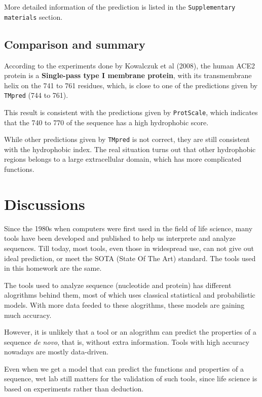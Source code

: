 \documentclass[en,black,10pt,normal]{elegantnote}
\newcommand{\upcite}[1]{\textsuperscript{\textsuperscript{\cite{#1}}}}
\begin{document}
More detailed information of the prediction is listed in the \texttt{Supplementary materials} section.


\subsection{Comparison and summary}

According to the experiments done by Kowalczuk et al (2008), the human ACE2 protein is a 
\textbf{Single-pass type I membrane protein}, with its 
transmembrane helix on the 741 to 761 residues,\upcite{kowalczuk2008protein} which,
is close to one of the predictions given by \texttt{TMpred} (744 to 761).

This result is consistent with the predictions given by \texttt{ProtScale}, 
which indicates that the 740 to 770 of the sequence has a high hydrophobic score.

While other predictions given by \texttt{TMpred} is not correct, 
they are still consistent with the hydrophobic index. 
The real situation turns out that other hydrophobic regions belongs to a large extracellular domain,
which has more complicated functions.


\section{Discussions}

Since the 1980s when computers were first used in the field of life science,
many tools have been developed and published to help us
interprete and analyze sequences. Till today, most tools, even those 
in widespread use, can not give out ideal prediction, or meet the SOTA (State Of The Art) standard.
The tools used in this homework are the same.

The tools used to analyze sequence (nucleotide and protein) has different alogrithms behind them,
most of which uses classical statistical and probabilistic models. With more data feeded to
these alogrithms, these models are gaining much accuracy.

However, it is unlikely that a tool or an alogrithm can predict the properties of 
a sequence \textit{de novo}, that is, without extra information. Tools with high 
accuracy nowadays are mostly data-driven.

Even when we get a model that can predict the functions and properties of a sequence,
wet lab still matters for the validation of such tools, since life science 
is based on experiments rather than deduction.
\end{document}
